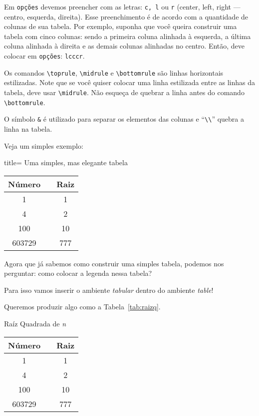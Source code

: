 Em \texttt{opções} devemos preencher com as letras: \texttt{c, l} ou \texttt{r} 
(center, left, right --- centro, esquerda, direita).
Esse preenchimento é de acordo com a quantidade de colunas de sua tabela. 
Por exemplo, suponha que você queira construir uma tabela com cinco colunas: 
sendo a primeira coluna alinhada à esquerda, a última coluna alinhada à direita 
e as demais colunas alinhadas no centro. 
Então, deve colocar em \texttt{opções}: \texttt{lcccr}.

Os comandos \Verb|\toprule|, \Verb|\midrule| e \Verb|\bottomrule| são linhas 
horizontais estilizadas.
Note que se você quiser colocar uma linha estilizada entre as linhas da tabela, 
deve usar \Verb|\midrule|.
Não esqueça de quebrar a linha antes do comando \Verb|\bottomrule|.

O símbolo \texttt{\&} é utilizado para separar os elementos das colunas e 
``\texttt{\textbackslash\textbackslash}'' quebra a linha na tabela.

Veja um simples exemplo:

\begin{tcblisting}{title= {Uma simples, mas elegante tabela}}
\begin{tabular}{ccc}
\toprule
  \textbf{Número} && \textbf{Raiz}\\
\midrule
  1      && 1\\
  4      && 2\\
  100    && 10\\
  603729 && 777\\
\bottomrule
\end{tabular}
\end{tcblisting}

Agora que já sabemos como construir uma simples tabela, podemos nos perguntar: 
como colocar a legenda nessa tabela?

Para isso vamos inserir o ambiente \textit{tabular} dentro do ambiente 
\textit{table}!

Queremos produzir algo como a Tabela~\ref{tab:raizq}.

\begin{margintable}
  \centering
  \caption{Raíz Quadrada de \textit{n}}
  \label{tab:raizq}
  \begin{tabular}{ccc}
    \toprule
    \textbf{Número}&&\textbf{Raiz}\\
    \midrule
    1 && 1\\
    4 && 2\\
    100 && 10\\
    603729 && 777\\
   \bottomrule
  \end{tabular}  
\end{margintable}

